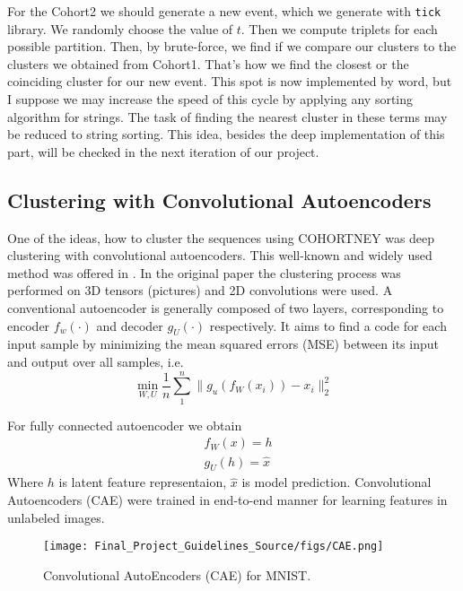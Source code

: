 \documentclass[10pt]{article}
\begin{document}
For the Cohort2 we should generate a new event, which we generate with \texttt{tick} library. We randomly choose the value of $t$. Then we compute triplets for each possible partition. Then, by brute-force, we find if we compare our clusters to the clusters we obtained from Cohort1. That's how we find the closest or the coinciding cluster for our new event. This spot is now implemented by word, but I suppose we may increase the speed of this cycle by applying any sorting algorithm for strings. The task of finding the nearest cluster in these terms may be reduced to string sorting. This idea, besides the deep implementation of this part, will be checked in the next iteration of our project.

\subsection{Clustering with Convolutional Autoencoders}\label{sec:CAE}
One of the ideas, how to cluster the sequences using COHORTNEY was deep clustering with convolutional autoencoders. This  well-known and widely used method   was offered in \cite{guo2017deep}. In the original paper \cite{guo2017deep} the clustering process was performed on 3D tensors (pictures) and 2D convolutions were used.
A conventional autoencoder is generally composed of two layers, corresponding to encoder $f_w(·)$ and decoder $g_U(·)$ respectively. It aims to find a code for each input sample by minimizing the mean squared errors (MSE) between its input and output over all samples, i.e.
\begin{equation}
    \label{eqn: mse}
    \min_{W, U} \frac{1}{n} \sum_{1}^{n} \|g_u(f_W(x_i)) - x_i\|_{2}^{2}
\end{equation}

For fully connected autoencoder we obtain
\begin{equation}
\label{eqn: }
    \begin{array}{cc}
         &  f_W(x) = h\\
         & g_U(h) = \hat{x}
    \end{array}
\end{equation}
Where $h$ is latent feature representaion, $\hat{x}$ is model prediction. 
Convolutional Autoencoders (CAE) were trained in end-to-end manner for learning features in unlabeled images.
\begin{figure}[h!]
\texttt{[image: Final\_Project\_Guidelines\_Source/figs/CAE.png]}
\caption{ Convolutional AutoEncoders (CAE) for MNIST.}
\label{fig:CAE}
\centering
\end{figure} 
\end{document}
